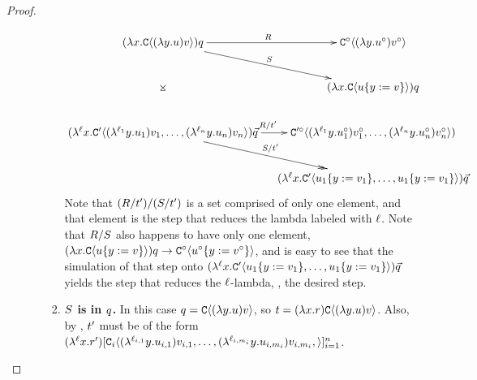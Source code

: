 \begin{proof}
\begin{enumerate}
\begin{enumerate}
\begin{enumerate}
            \[
            \xymatrix@C=0.4cm{
              (\lam{\var}{\conof{(\lam{\vartwo}{\tmthree}) \tmthreevariant}}) \tmsix
                \ar@{->}[r]^{\redex} \ar@{->}[rd]^{\redextwo} \ar@{}[dd]|*=0[@]{\rtimes}
                  & \con^{\circ}\of{(\lam{\vartwo}{\tmthree^{\circ}}) \tmthreevariant^{\circ}} \\
                & (\lam{\var}{\conof{\subs{\tmthree}{\vartwo}{\tmthreevariant}}}) \tmsix \\
              (\lamp{\lab}{\var}{\contwoof{(\lamp{\lab_1}{\vartwo}{\tmthree_1}) \tmthreevariant_1, \hdots, (\lamp{\lab_n}{\vartwo}{\tmthree_n}) \tmthreevariant_n}}) \ls{\tmsix}
                \ar@{->}[r]^{\redex / \tm'} \ar@{->>}[rd]^{\redextwo / \tm'}
                & \con'^{\circ}\of{(\lamp{\lab_1}{\vartwo}{\tmthree^{\circ}_1}) \tmthreevariant^{\circ}_1, \hdots, (\lamp{\lab_n}{\vartwo}{\tmthree^{\circ}_n}) \tmthreevariant^{\circ}_n}) \\
              & (\lamp{\lab}{\var}{\contwoof{\subs{\tmthree_1}{\vartwo}{\tmthreevariant_1}, \hdots, \subs{\tmthree_1}{\vartwo}{\tmthreevariant_1}}}) \ls{\tmsix} \\
            }
            \]
            Note that $(R / t') / (S / t')$ is a set comprised of only one element,
            and that element is the step that reduces the lambda labeled with $\ell$.
            Note that $R / S$ also happens to have only one element,
            $(\lambda x. \mathtt{C}\langle u\{y := v\}\rangle) q \to
              \mathtt{C}^{\circ}\langle u^{\circ}\{y := v^{\circ}\}\rangle$, and is easy to see
            that the simulation of that step onto $(\lambda^{\ell} x. \mathtt{C}'\langle u_1\{y := v_1\}, \hdots, u_1\{y := v_1\}\rangle) \vec{q}$
            yields the step that reduces the $\ell$-lambda, \ie, the desired step.
          \item {\bf $S$ is in $q$.}
            In this case $q = \mathtt{C}\langle(\lambda y. u) v\rangle$,
            so $t = (\lambda x. r) \mathtt{C}\langle(\lambda y. u) v\rangle$.
            Also, by , $t'$ must be of the form
            $(\lambda^{\ell} x. r')
              [\mathtt{C}_i\langle
                (\lambda^{\ell_{i,1}} y. u_{i,1}) v_{i,1},
                \hdots,
                (\lambda^{\ell_{i,m_i}} y. u_{i,m_i}) v_{i,m_i},
              \rangle]_{i=1}^n$.
            \[
\]
\end{enumerate}
\end{enumerate}
\end{enumerate}
\end{proof}
